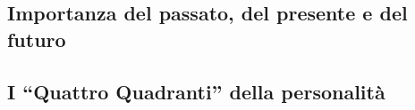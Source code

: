 \documentclass{subfiles}
\begin{document}
\subsection{Importanza del passato, del presente e del futuro}


\subsection{I ``Quattro Quadranti'' della personalità}


\clearpage
\end{document}
